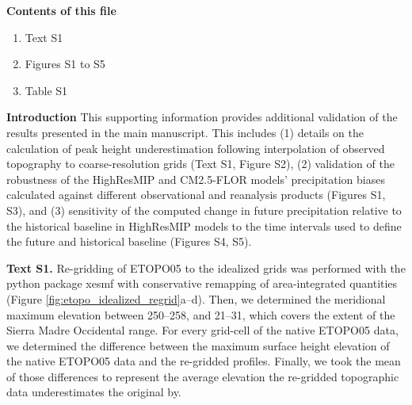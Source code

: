 \documentclass[draft,ef]{agutexSI2019}
\begin{document}
\begin{article}

\noindent\textbf{Contents of this file}
\begin{enumerate}
\item Text S1
\item Figures S1 to S5
\item Table S1
\end{enumerate}

\noindent\textbf{Introduction}
This supporting information provides additional validation of the results presented in the main manuscript. This includes (1) details on the calculation of peak height underestimation following interpolation of observed topography to coarse-resolution grids (Text S1, Figure S2), (2) validation of the robustness of the HighResMIP and CM2.5-FLOR models' precipitation biases calculated against different observational and reanalysis products (Figures S1, S3), and (3) sensitivity of the computed change in future precipitation relative to the historical baseline in HighResMIP models to the time intervals used to define the future and historical baseline (Figures S4, S5).

\clearpage

\noindent\textbf{Text S1.}
Re-gridding of ETOPO05 \cite{center93ngdcn} to the idealized grids was performed with the python package xesmf with conservative remapping of area-integrated quantities (Figure \ref{fig:etopo_idealized_regrid}a--d). Then, we determined the meridional maximum elevation between 250--258, and 21--31, which covers the extent of the Sierra Madre Occidental range. For every grid-cell of the native ETOPO05 data, we determined the difference between the maximum surface height elevation of the native ETOPO05 data and the re-gridded profiles. Finally, we took the mean of those differences to represent the average elevation the re-gridded topographic data underestimates the original by.


 

\end{article}
\clearpage


\end{document}
